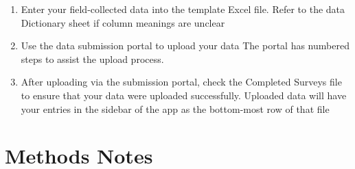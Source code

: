 \documentclass[
  letterpaper,
  oneside,
  open=any]{scrbook}
\begin{document}
\begin{enumerate}
\def\labelenumi{\arabic{enumi}.}
\item
  Enter your field-collected data into the template Excel file. Refer to
  the data Dictionary sheet if column meanings are unclear
\item
  Use the data submission portal to upload your data The portal has
  numbered steps to assist the upload process.
\item
  After uploading via the submission portal, check the Completed Surveys
  file to ensure that your data were uploaded successfully. Uploaded
  data will have your entries in the sidebar of the app as the
  bottom-most row of that file
\end{enumerate}

\section{Methods Notes}\label{methods-notes}
\end{document}
